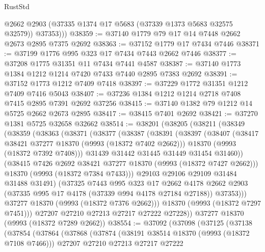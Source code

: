 \begin{lexlean}{RustStd}
\begin{coremodule}
          @2662
          @2903
          (@37335 @1374 @17 @5683 (@37339 @1373 @5683 @32575 @32579))
          @37353)))
@38359 := @37140 @1779 @79 @17 @14 @7448 @2662 @2673 @2895 @7375 @2692
@38363 := @37152 @1779 @17 @7434 @7446
@38371 := @37199 @1776 @995 @323 @17 @7434 @7443 @2662 @7446
@38377 := @37208 @1775 @31351 @11 @7434 @7441 @4587
@38387 := @37140 @1773 @1384 @1212 @1214 @7420 @7433 @7440 @2895 @7383 @2692
@38391 := @37152 @1773 @1212 @7409 @7418
@38397 := @37229 @1772 @31351 @1212 @7409 @7416 @5043
@38407 := @37236 @1384 @1212 @1214 @2718 @7408 @7415 @2895 @7391 @2692 @37256
@38415 := @37140 @1382 @79 @1212 @14 @5725 @2662 @2673 @2895
@38417 := @38415 @7401 @2692
@38421 := @37270 @1381 @5725 @32658 @32662
@38514 := @38201
    (@38205
      (@38211
        (@38349
          (@38359
            (@38363
              (@38371
                (@38377
                  (@38387
                    (@38391
                      (@38397
                        (@38407
                          (@38417 @38421 @37277 @18370 (@9993 (@18372 @7402 @2662)))
                          @18370
                          (@9993 (@18372 @7392 @7408)))
                        @31439
                        @31442
                        @31445
                        @31449
                        @31454
                        @31460))
                    (@38415 @7426 @2692 @38421 @37277 @18370 (@9993 (@18372 @7427 @2662)))
                    @18370
                    (@9993 (@18372 @7384 @7433)))
                  @29103
                  @29106
                  @29109
                  @31484
                  @31488
                  @31491)
                (@37325
                  @7443
                  @995
                  @323
                  @17
                  @2662
                  @4178
                  @2662
                  @2903
                  (@37335 @995 @17 @4178 (@37339 @994 @4178 @27184 @27188))
                  @37353)))
            @37277
            @18370
            (@9993 (@18372 @7376 @2662)))
          @18370
          (@9993 (@18372 @7297 @7451)))
        @27207
        @27210
        @27213
        @27217
        @27222
        @27228))
    @37277
    @18370
    (@9993 (@18372 @7289 @2662))
@38554 := @37092
    (@37098
      (@37125
        (@37138
          (@37854
            (@37864
              (@37868
                (@37874
                  (@38191 @38514 @18370 (@9993 (@18372 @7108 @7466)))
                  @27207
                  @27210
                  @27213
                  @27217
                  @27222

\end{coremodule}
\end{lexlean}
